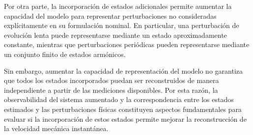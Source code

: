 Por otra parte, la incorporación de estados adicionales permite aumentar la 
capacidad del modelo para representar perturbaciones no consideradas 
explícitamente en su formulación nominal. En particular, una perturbación de 
evolución lenta puede representarse mediante un estado aproximadamente 
constante, mientras que perturbaciones periódicas pueden representarse mediante 
un conjunto finito de estados armónicos.

Sin embargo, aumentar la capacidad de representación del modelo no garantiza 
que todos los estados incorporados puedan ser reconstruidos de manera 
independiente a partir de las mediciones disponibles. Por esta razón, la 
observabilidad del sistema aumentado y la correspondencia entre los estados 
estimados y las perturbaciones físicas constituyen aspectos fundamentales para 
evaluar si la incorporación de estos estados permite mejorar la reconstrucción 
de la velocidad mecánica instantánea.
